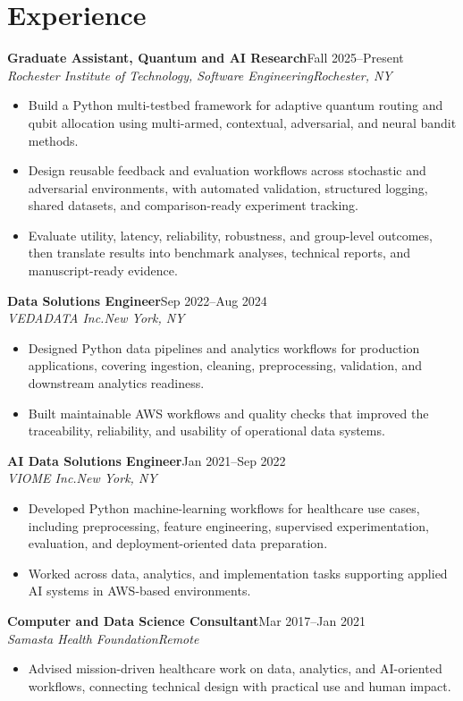 \documentclass[10pt,letterpaper]{article}
\newcommand{\role}[4]{%
  \textbf{#1}\hfill #2\\
  \textit{#3}\hfill \textit{#4}\vspace{-3pt}
}
\begin{document}
\section*{Experience}
\role{Graduate Assistant, Quantum and AI Research}{Fall 2025--Present}
{Rochester Institute of Technology, Software Engineering}{Rochester, NY}
\begin{itemize}
  \item Build a Python multi-testbed framework for adaptive quantum routing and
    qubit allocation using multi-armed, contextual, adversarial, and neural
    bandit methods.
  \item Design reusable feedback and evaluation workflows across stochastic and
    adversarial environments, with automated validation, structured logging,
    shared datasets, and comparison-ready experiment tracking.
  \item Evaluate utility, latency, reliability, robustness, and group-level
    outcomes, then translate results into benchmark analyses, technical reports,
    and manuscript-ready evidence.
\end{itemize}

\role{Data Solutions Engineer}{Sep 2022--Aug 2024}
{VEDADATA Inc.}{New York, NY}
\begin{itemize}
  \item Designed Python data pipelines and analytics workflows for production
    applications, covering ingestion, cleaning, preprocessing, validation, and
    downstream analytics readiness.
  \item Built maintainable AWS workflows and quality checks that improved the
    traceability, reliability, and usability of operational data systems.
\end{itemize}

\role{AI Data Solutions Engineer}{Jan 2021--Sep 2022}
{VIOME Inc.}{New York, NY}
\begin{itemize}
  \item Developed Python machine-learning workflows for healthcare use cases,
    including preprocessing, feature engineering, supervised experimentation,
    evaluation, and deployment-oriented data preparation.
  \item Worked across data, analytics, and implementation tasks supporting
    applied AI systems in AWS-based environments.
\end{itemize}

\role{Computer and Data Science Consultant}{Mar 2017--Jan 2021}
{Samasta Health Foundation}{Remote}
\begin{itemize}
  \item Advised mission-driven healthcare work on data, analytics, and
    AI-oriented workflows, connecting technical design with practical use and
    human impact.
\end{itemize}
\end{document}
